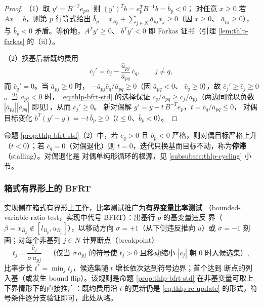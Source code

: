 \begin{proof}
（1）取 $y'=B^{-T}e_p$。则 $(y')^{T}b=e_p^{T}B^{-1}b=\bar b_p<0$；
对任意 $x\ge0$ 若 $Ax=b$，则第 $p$ 行等式给出
$\bar b_p=x_{B_p}+\sum_{j\in N}\bar a_{pj}x_j\ge0$（因 $x\ge0$、
$\bar a_{pj}\ge0$），与 $\bar b_p<0$ 矛盾。等价地，$A^{T}y'\ge0$、
$b^{T}y'<0$ 即 Farkas 证书（引理 \ref{lem:thlp-farkas} 的（ii））。

（2）换基后新既约费用
\begin{equation}\label{eq:thlp-rc-update}
  \bar c_j'=\bar c_j-\frac{\bar a_{pj}}{\bar a_{pq}}\,\bar c_q ,
  \qquad j\ne q,
\end{equation}
而 $\bar c_q'=0$。当 $\bar a_{pj}\ge0$ 时，
$-\bar a_{pj}\bar c_q/\bar a_{pq}\ge0$（因 $\bar a_{pq}<0$、
$\bar c_q\ge0$），故 $\bar c_j'\ge\bar c_j\ge0$。当 $\bar a_{pj}<0$ 时，
\eqref{eq:thlp-bfrt-std} 的选择保证
$\bar c_q/\bar a_{pq}\ge\bar c_j/\bar a_{pj}$（两边同除以负数
$|\bar a_{pj}||\bar a_{pq}|$ 即见），从而 $\bar c_j'\ge0$。
新对偶解 $y'=y-t\,B^{-T}e_p$，$t=\bar c_q/\bar a_{pq}\le0$，
对偶目标变化 $b^{T}(y'-y)=-t\,\bar b_p\ge0$（$t\le0$、$\bar b_p<0$）。
\end{proof}

\begin{remark}\label{rem:thlp-dual-progress}
命题 \ref{prop:thlp-bfrt-std}（2）中，若 $\bar c_q>0$ 且 $\bar b_p<0$
严格，则对偶目标严格上升（$t<0$）；若 $\bar c_q=0$（对偶退化）则
$t=0$，迭代只换基而目标不动，称为\textbf{停滞}（stalling）。对偶退化是
对偶单纯形循环的根源，见 \ref{subsubsec:thlp-cycling} 小节。
\end{remark}

\subsubsection{箱式有界形上的 BFRT}

实现侧在箱式有界形上工作，比率测试推广为\textbf{有界变量比率测试}
（bounded-variable ratio test，实现中代号 BFRT）：出基行 $p$ 的基变量违反
界（$\beta=x_{B_p}\notin[l_{B_p},u_{B_p}]$），以移动方向
$\sigma=+1$（从下侧违反推向 $u$）或 $\sigma=-1$ 刻画；对每个非基列
$j\in N$ 计算断点（breakpoint）
\begin{equation}\label{eq:thlp-bfrt-boxed}
  t_j=\frac{\bar c_j}{\sigma\,\bar a_{pj}}
  \quad\text{（仅当 }\sigma\,\bar a_{pj}\text{ 的符号使 }t_j>0
  \text{ 且移动缩小 }|\bar c_j|\text{ 朝 }0\text{ 时入候选集）},
\end{equation}
比率步长 $t^{*}=\min_j t_j$，候选集随 $t$ 增长依次达到符号边界；首个达到
断点的列入基（或发生 bound flip）。该规则是命题 \ref{prop:thlp-bfrt-std}
在非基变量可取上下界情形下的直接推广：既约费用沿 $t$ 的更新仍是
\eqref{eq:thlp-rc-update} 的形式，符号条件逐分支验证即可，此处从略。

